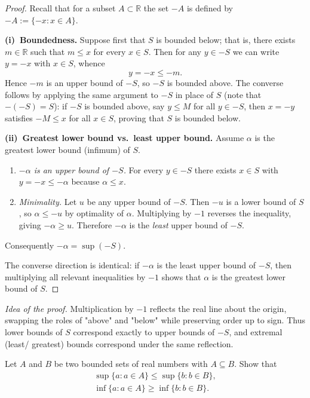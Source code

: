 \documentclass[10pt]{extarticle}
\begin{document}
\begin{proof}
    Recall that for a subset $A\subset\mathbb R$ the set $-A$ is defined by $-A:=\{-x:x\in A\}$.

    \medskip
    \textbf{(i)~Boundedness.}  Suppose first that $S$ is bounded below; that is, there exists $m\in\mathbb R$ such that $m\le x$ for every $x\in S$.  Then for any $y\in -S$ we can write $y=-x$ with $x\in S$, whence
    \[
        y=-x\le -m.
    \]
    Hence $-m$ is an upper bound of $-S$, so $-S$ is bounded above.  The converse follows by applying the same argument to $-S$ in place of $S$ (note that $-(-S)=S$): if $-S$ is bounded above, say $y\le M$ for all $y\in -S$, then $x=-y$ satisfies $-M\le x$ for all $x\in S$, proving that $S$ is bounded below.

    \medskip
    \textbf{(ii)~Greatest lower bound vs.~least upper bound.}  Assume $\alpha$ is the greatest lower bound (infimum) of $S$.
    \begin{enumerate}
        \item  \emph{$-\alpha$ is an upper bound of $-S$.}  For every $y\in -S$ there exists $x\in S$ with $y=-x\le -\alpha$ because $\alpha\le x$.
        \item  \emph{Minimality.}  Let $u$ be any upper bound of $-S$.  Then $-u$ is a lower bound of $S$, so $\alpha\le -u$ by optimality of $\alpha$.  Multiplying by $-1$ reverses the inequality, giving $-\alpha\ge u$.  Therefore $-\alpha$ is the \emph{least} upper bound of $-S$.
    \end{enumerate}
    Consequently $-\alpha=\sup(-S)$.

    The converse direction is identical: if $-\alpha$ is the least upper bound of $-S$, then multiplying all relevant inequalities by $-1$ shows that $\alpha$ is the greatest lower bound of $S$.
\end{proof}

\begin{remark}
    \emph{Idea of the proof.}  Multiplication by $-1$ reflects the real line about the origin, swapping the roles of "above" and "below" while preserving order up to sign.  Thus lower bounds of $S$ correspond exactly to upper bounds of $-S$, and extremal (least/ greatest) bounds correspond under the same reflection.
\end{remark}

\begin{exercise}[6.3]
    Let $A$ and $B$ be two bounded sets of real numbers with $A \subseteq B$. Show that
    \begin{equation*}
        \begin{gathered}
            \sup \{a: a \in A\} \leqslant \sup \{b: b \in B\}, \\
            \inf \{a: a \in A\} \geqslant \inf \{b: b \in B\} .
        \end{gathered}
    \end{equation*}
\end{exercise}
\end{document}
